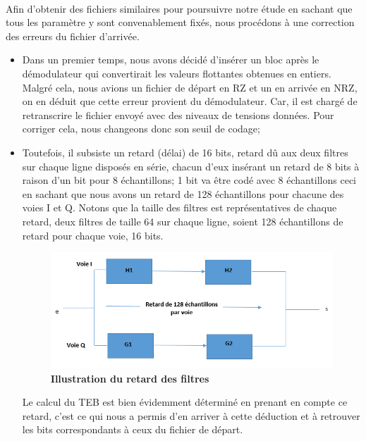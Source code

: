 \paragraph{}
Afin d'obtenir des fichiers similaires pour poursuivre notre étude en sachant que tous les paramètre y sont convenablement fixés, nous procédons à une correction des erreurs du fichier d'arrivée.
\begin{itemize}
\item  Dans un premier temps, nous avons décidé d'insérer un bloc après le démodulateur qui convertirait les valeurs flottantes obtenues en entiers. Malgré cela, nous avions un fichier de départ en RZ et un en arrivée en NRZ, on en déduit que cette erreur provient du démodulateur. Car, il est chargé de retranscrire le fichier envoyé avec des niveaux de tensions données. Pour corriger cela, nous changeons donc son seuil de codage;
\item Toutefois, il subsiste un retard (délai) de 16 bits, retard dû aux deux filtres sur chaque ligne disposés en série, chacun d'eux insérant un retard de 8 bits à raison d'un bit pour 8 échantillons;
1 bit va être codé avec 8 échantillons ceci en sachant que nous avons un retard de 128 échantillons pour chacune des voies I et Q. Notons que la taille des filtres est représentatives de chaque retard, deux filtres de taille 64 sur chaque ligne, soient 128 échantillons de retard pour chaque voie, 16 bits.


\clearpage

\begin{figure}[bth]%
\begin{center}
\includegraphics[scale=0.75]{filtres}%
\caption{\textbf{Illustration du retard des filtres}}%
\label{filtres}%
\end {center}
\end{figure}


Le calcul du TEB est bien évidemment déterminé en prenant en compte ce retard, c'est ce qui nous a permis d'en arriver à cette déduction et à retrouver les bits correspondants à ceux du fichier de départ.
\end{itemize}

